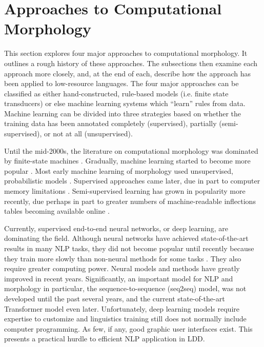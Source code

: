 \documentclass[12pt]{article}
\begin{document}
\section{Approaches to Computational Morphology}
\label{compMorph}

This section explores four major approaches to computational morphology. It outlines a rough history of these approaches. The subsections then examine each approach more closely, and, at the end of each, describe how the approach has been applied to low-resource languages. The four major approaches can be classified as either hand-constructed, rule-based models (i.e. finite state transducers) or else machine learning systems which ``learn'' rules from data. Machine learning can be divided into three strategies based on whether the training data has been annotated completely (supervised), partially (semi-supervised), or not at all (unsupervised). 

Until the mid-2000s, the literature on computational morphology was dominated by finite-state machines \cite{kaplan_phonological_1981,koskenniemi_two-level_1983,beesley_finite-state_2003}. Gradually, machine learning started to become more popular \cite{cohen_joint_2007,ruokolainen_comparative_2016}. Most early machine learning of morphology used unsupervised, probabilistic models \cite{roark_computational_2007}. Supervised approaches came later, due in part to computer memory limitations \cite{hammarstrom_unsupervised_2011}. Semi-supervised learning has grown in popularity more recently, due perhaps in part to greater numbers of machine-readable inflections tables becoming available online \cite{schone_knowledge-free_2001,soricut_unsupervised_2015,goldsmith_computational_2017}. 

Currently, supervised end-to-end neural networks, or deep learning, are dominating the field. Although neural networks have achieved state-of-the-art results in many NLP tasks, they did not become popular until recently because they train more slowly than non-neural methods for some tasks \cite{cotterell_cross-lingual_2017}. They also require greater computing power. Neural models and methods have greatly improved in recent years. Significantly, an important model for NLP and morphology in particular, the sequence-to-sequence (seq2seq) model, was not developed until the past several years, and the current state-of-the-art Transformer model even later. Unfortunately, deep learning models require expertise to customize and linguistics training still does not normally include computer programming. As few, if any, good graphic user interfaces exist. This presents a practical hurdle to efficient NLP application in LDD.  
\end{document}
